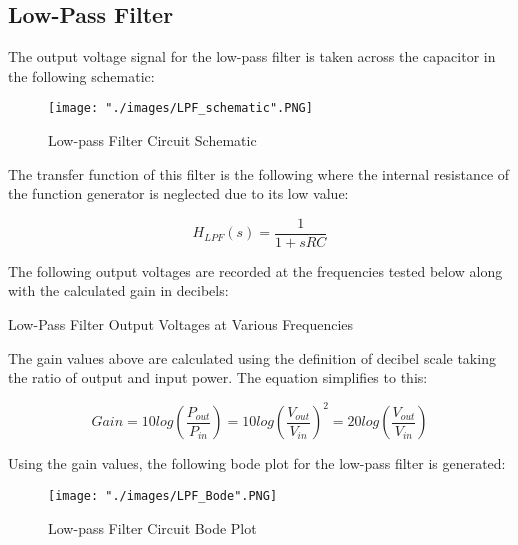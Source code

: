 \documentclass{article}
\begin{document}
	\subsection{Low-Pass Filter}
	
	The output voltage signal for the low-pass filter is taken across the capacitor in the following schematic:
	
	\begin{figure}[h!]
		\centering
		\texttt{[image: "./images/LPF\_schematic".PNG]}
		\caption{Low-pass Filter Circuit Schematic}
		\label{fig:LPF_Schematic}
	\end{figure}
	
	The transfer function of this filter is the following where the internal resistance of the function generator is neglected due to its low value:
	
	\begin{equation}
	\label{eq:lpf_transfer}
	H_{LPF}(s) = \frac{1}{1+sRC}
	\end{equation}
	
	The following output voltages are recorded at the frequencies tested below along with the calculated gain in decibels:
	
	\FloatBarrier
	
	\begin{table}[h!]
		\centering
		\caption{Low-Pass Filter Output Voltages at Various Frequencies}
		\label{tab:lpf_vout}
	\end{table}
	
	\FloatBarrier
	
	The gain values above are calculated using the definition of decibel scale taking the ratio of output and input power. The equation simplifies to this:
	
	\begin{equation}
	\label{eq:decibels}
	Gain = 10 log(\frac{P_{out}}{P_{in}}) = 10 log (\frac{V_{out}}{ V_{in}})^2 = 20 log (\frac{V_{out}}{ V_{in}})
	\end{equation}
	
	Using the gain values, the following bode plot for the low-pass filter is generated:
	
	\FloatBarrier
	
	\begin{figure}[h!]
		\centering
		\texttt{[image: "./images/LPF\_Bode".PNG]}
		\caption{Low-pass Filter Circuit Bode Plot}
		\label{fig:LPF_Bode}
	\end{figure}
	
\end{document}
